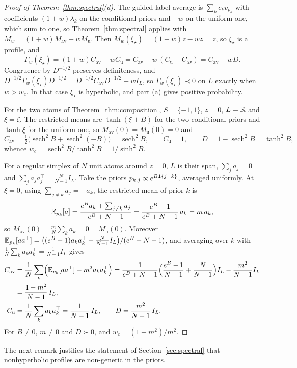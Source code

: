 \documentclass{article} %
\newcommand{\iclrbr}{\\&}\newcommand{\iclrbrq}{\\&\qquad}\newcommand{\iclrqbr}{\\&}
\newcommand{\iclrbr}{}\newcommand{\iclrbrq}{}\newcommand{\iclrqbr}{\qquad}
\theoremstyle{plain}
\theoremstyle{definition}
\theoremstyle{remark}
\begin{document}
\begin{proof}[Proof of Theorem~\ref{thm:spectral}(d)]
The guided label average is $\sum_kc_kv_{p_k}$ with coefficients $(1+w)\lambda_k$ on the
conditional priors and $-w$ on the uniform one, which sum to one, so Theorem~\ref{thm:spectral}
applies with $M_w=(1+w)M_{\mathrm{av}}-wM_{\mathrm u}$. Then $M_w(\xi_\star)=(1+w)z-wz=z$, so
$\xi_\star$ is a profile, and
\[
\Gamma_w(\xi_\star)=(1+w)C_{\mathrm{av}}-wC_{\mathrm u}=C_{\mathrm{av}}-w\,(C_{\mathrm u}-C_{\mathrm{av}})
=C_{\mathrm{av}}-wD .
\]
Congruence by $D^{-1/2}$ preserves definiteness, and
$D^{-1/2}\Gamma_w(\xi_\star)D^{-1/2}=D^{-1/2}C_{\mathrm{av}}D^{-1/2}-wI_L$, so $\Gamma_w(\xi_\star)\prec0$
on $L$ exactly when $w>w_c$. In that case $\xi_\star$ is hyperbolic, and part (a)
gives positive probability.

For the two atoms of Theorem~\ref{thm:composition}, $S=\{-1,1\}$, $z=0$, $L=\mathbb{R}$ and $\xi=\zeta$. The
restricted means are $\tanh(\xi\pm B)$ for the two conditional priors and $\tanh\xi$ for the uniform
one, so $M_{\mathrm{av}}(0)=M_{\mathrm u}(0)=0$ and
\[
C_{\mathrm{av}}=\tfrac12\bigl(\operatorname{sech}^2B+\operatorname{sech}^2(-B)\bigr)=\operatorname{sech}^2B,
\qquad C_{\mathrm u}=1,\qquad D=1-\operatorname{sech}^2B=\tanh^2B,
\]
whence $w_c=\operatorname{sech}^2B/\tanh^2B=1/\sinh^2B$.

For a regular simplex of $N$ unit atoms around $z=0$, $L$ is their span, $\sum_ja_j=0$ and
$\sum_ja_ja_j^\top=\frac{N}{N-1}I_L$. Take the priors $p_{k,j}\propto e^{B\mathbf{1}\{j=k\}}$, averaged
uniformly. At $\xi=0$, using $\sum_{j\ne k}a_j=-a_k$, the restricted mean of prior $k$ is
\[
\mathbb{E}_{p_k}[a]=\frac{e^Ba_k+\sum_{j\ne k}a_j}{e^B+N-1}=\frac{e^B-1}{e^B+N-1}\,a_k=m\,a_k ,
\]
so $M_{\mathrm{av}}(0)=\frac mN\sum_ka_k=0=M_{\mathrm u}(0)$. Moreover
$\mathbb{E}_{p_k}[aa^\top]=\bigl((e^B-1)a_ka_k^\top+\frac{N}{N-1}I_L\bigr)/(e^B+N-1)$, and averaging over $k$
with $\frac1N\sum_ka_ka_k^\top=\frac1{N-1}I_L$ gives
\begin{align*}
C_{\mathrm{av}}&=\frac1N\sum_k\Bigl(\E_{p_k}[aa^\top]-m^2a_ka_k^\top\Bigr)
=\frac{1}{e^B+N-1}\Bigl(\frac{e^B-1}{N-1}+\frac{N}{N-1}\Bigr)I_L-\frac{m^2}{N-1}I_L
\iclrbr=\frac{1-m^2}{N-1}\,I_L,\\
C_{\mathrm u}&=\frac1N\sum_ka_ka_k^\top=\frac1{N-1}\,I_L,\qquad D=\frac{m^2}{N-1}\,I_L .
\end{align*}
For $B\ne0$, $m\ne0$ and $D\succ0$, and $w_c=(1-m^2)/m^2$.
\end{proof}

The next remark justifies the statement of Section~\ref{sec:spectral} that nonhyperbolic profiles
are non-generic in the priors.
\end{document}
